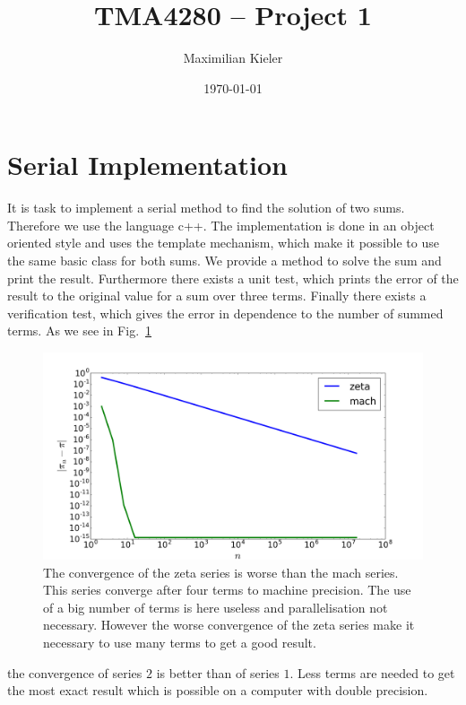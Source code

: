 







\title{TMA4280 -- Project 1}
\author{Maximilian Kieler}
\date{\today}

\maketitle



\section{Serial Implementation}

It is task to implement a serial method to find the solution of two sums. Therefore we use the language c++. The implementation is done in an object oriented style and uses the template mechanism, which make it possible to use the same basic class for both sums. We provide a method to solve the sum and print the result. Furthermore there exists a unit test, which prints the error of the result to the original value for a sum over three terms. Finally there exists a verification test, which gives the error in dependence to the number of summed terms. As we see in Fig.~\ref{fig:convergence_series}\begin{figure}[h] 
  \centering
     \includegraphics[width=\textwidth]{pic/convergence_series.png}
  \caption{The convergence of the zeta series is worse than the mach series. This series converge after four terms to machine precision. The use of a big number of terms is here useless and parallelisation not necessary. However the worse convergence of the zeta series make it necessary to use many terms to get a good result.}
  \label{fig:convergence_series}
\end{figure} the convergence of series $2$ is better than of series $1$. Less terms are needed to get the most exact result which is possible on a computer with double precision. 






